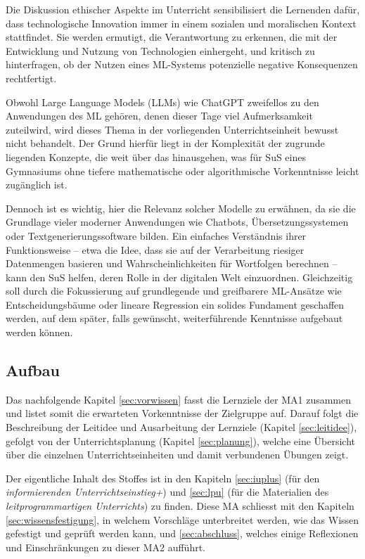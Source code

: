 \documentclass[twocolumn]{article}
\begin{document}
Die Diskussion ethischer Aspekte im Unterricht sensibilisiert die Lernenden dafür, dass technologische Innovation immer in einem sozialen und moralischen Kontext stattfindet. Sie werden ermutigt, die Verantwortung zu erkennen, die mit der Entwicklung und Nutzung von Technologien einhergeht, und kritisch zu hinterfragen, ob der Nutzen eines ML-Systems potenzielle negative Konsequenzen rechtfertigt.

Obwohl Large Language Models (LLMs) wie ChatGPT zweifellos zu den Anwendungen des ML gehören, denen dieser Tage viel Aufmerksamkeit zuteilwird, wird dieses Thema in der vorliegenden Unterrichtseinheit bewusst nicht behandelt. Der Grund hierfür liegt in der Komplexität der zugrunde liegenden Konzepte, die weit über das hinausgehen, was für SuS eines Gymnasiums ohne tiefere mathematische oder algorithmische Vorkenntnisse leicht zugänglich ist.

Dennoch ist es wichtig, hier die Relevanz solcher Modelle zu erwähnen, da sie die Grundlage vieler moderner Anwendungen wie Chatbots, Übersetzungssystemen oder Textgenerierungssoftware bilden. Ein einfaches Verständnis ihrer Funktionsweise – etwa die Idee, dass sie auf der Verarbeitung riesiger Datenmengen basieren und Wahrscheinlichkeiten für Wortfolgen berechnen – kann den SuS helfen, deren Rolle in der digitalen Welt einzuordnen. Gleichzeitig soll durch die Fokussierung auf grundlegende und greifbarere ML-Ansätze wie Entscheidungsbäume oder lineare Regression ein solides Fundament geschaffen werden, auf dem später, falls gewünscht, weiterführende Kenntnisse aufgebaut werden können.

\subsection{Aufbau}
Das nachfolgende Kapitel \ref{sec:vorwissen} fasst die Lernziele der MA1 zusammen und listet somit die erwarteten Vorkenntnisse der Zielgruppe auf. Darauf folgt die Beschreibung der Leitidee und Ausarbeitung der Lernziele (Kapitel \ref{sec:leitidee}), gefolgt von der Unterrichtsplanung (Kapitel \ref{sec:planung}), welche eine Übersicht über die einzelnen Unterrichtseinheiten und damit verbundenen Übungen zeigt.

Der eigentliche Inhalt des Stoffes ist in den Kapiteln \ref{sec:iuplus} (für den \textit{informierenden Unterrichtseinstieg+}) und \ref{sec:lpu} (für die Materialien des \textit{leitprogrammartigen Unterrichts}) zu finden. Diese MA schliesst mit den Kapiteln \ref{sec:wissensfestigung}, in welchem Vorschläge unterbreitet werden, wie das Wissen gefestigt und geprüft werden kann, und \ref{sec:abschluss}, welches einige Reflexionen und Einschränkungen zu dieser MA2 aufführt.
\end{document}
